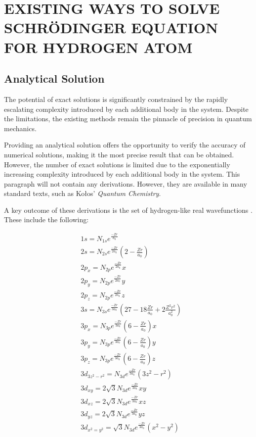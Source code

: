 \section{EXISTING WAYS TO SOLVE SCHRÖDINGER EQUATION FOR HYDROGEN ATOM}

\subsection{Analytical Solution}

The potential of exact solutions is significantly constrained by the rapidly escalating complexity introduced by each additional body in the system. Despite the limitations, the existing methods remain the pinnacle of precision in quantum mechanics.

Providing an analytical solution offers the opportunity to verify the accuracy of numerical solutions, making it the most precise result that can be obtained. However, the number of exact solutions is limited due to the exponentially increasing complexity introduced by each additional body in the system. This paragraph will not contain any derivations. However, they are available in many standard texts, such as Kołos' \textit{Quantum Chemistry}.

A key outcome of these derivations is the set of hydrogen-like real wavefunctions \cite{kolos1978}. These include the following:

\begin{equation}
	\label{eq211}
	\begin{aligned}
		& 1s = N_{1s}e^{\frac{-Zr}{a_0}} \\
		& 2s = N_{2s}e^{\frac{-Zr}{2a_0}}(2 - \frac{Zr}{a_0}) \\
		& 2p_x =  N_{2p}e^{\frac{-Zr}{2a_0}}x \\
		& 2p_y =  N_{2p}e^{\frac{-Zr}{2a_0}}y \\
		& 2p_z =  N_{2p}e^{\frac{-Zr}{2a_0}}z \\		
		& 3s = N_{3s}e^{\frac{-Zr}{3a_0}}(27 - 18\frac{Zr}{a_0} + 2\frac{Z^2r^2}{a^2_0}) \\
		& 3p_x =  N_{3p}e^{\frac{-Zr}{3a_0}}(6-\frac{Zr}{a_0})x \\
		& 3p_y =  N_{3p}e^{\frac{-Zr}{3a_0}}(6-\frac{Zr}{a_0})y \\
		& 3p_z =  N_{3p}e^{\frac{-Zr}{3a_0}}(6-\frac{Zr}{a_0})z \\
		& 3d_{3z^2-r^2} =  N_{3d}e^{\frac{-Zr}{3a_0}}(3z^2-r^2) \\
		& 3d_{xy} =  2\sqrt{3}N_{3d}e^{\frac{-Zr}{3a_0}}xy \\
		& 3d_{xz} =  2\sqrt{3}N_{3d}e^{\frac{-Zr}{3a_0}}xz \\
		& 3d_{yz} =  2\sqrt{3}N_{3d}e^{\frac{-Zr}{3a_0}}yz \\
		& 3d_{x^2=y^2} =  \sqrt{3}N_{3d}e^{\frac{-Zr}{3a_0}}(x^2-y^2) \\
	\end{aligned}
\end{equation}

